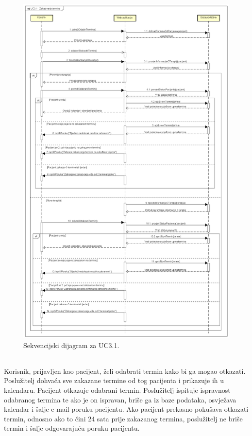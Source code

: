 				\begin{figure}[H]
					\includegraphics[scale=0.37]{slike/UC3.1_Zakazivanje_termina}
					\centering
					\caption{Sekvencijski dijagram za UC3.1.}
				\end{figure}
				
			\newpage
				
				\textbf{}\\
				
				Korisnik, prijavljen kao pacijent, želi odabrati termin kako bi ga mogao otkazati. Poslužitelj dohvaća sve zakazane termine od tog pacijenta i prikazuje ih u kalendaru. Pacijent otkazuje odabrani termin. Poslužitelj ispituje ispravnost odabranog termina te ako je on ispravan, briše ga iz baze podataka, osvježava kalendar i šalje e-mail poruku pacijentu. Ako pacijent prekasno pokušava otkazati termin, odnosno ako to čini 24 sata prije zakazanog termina, poslužitelj ne briše termin i šalje odgovarajuću poruku pacijentu.
				

